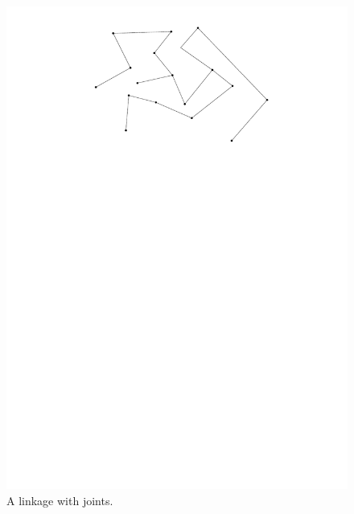 \begin{figure}[h]
\begin{center}
\includegraphics[scale=.5]{graphics/randomLinkage.pdf}
\end{center} 
\caption{A linkage with joints.}
\end{figure} 
